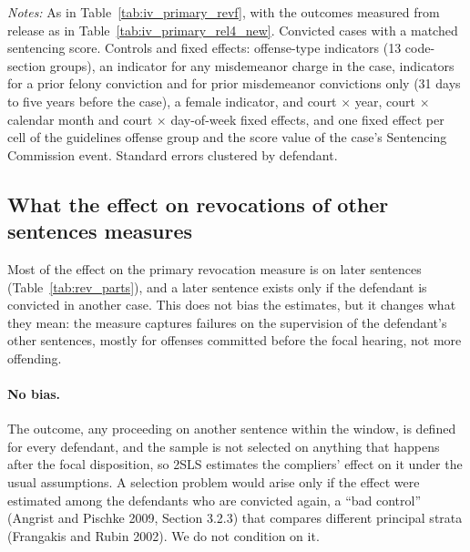 \documentclass[11pt]{article}
\newcommand{\tabnote}[1]{\par\vspace{0.6ex}\begin{minipage}{\linewidth}\linespread{1}\footnotesize\textit{Notes:} #1\end{minipage}}
\newcommand{\controlsnote}{offense-type indicators (13 code-section groups), an indicator for any misdemeanor charge in the case, indicators for a prior felony conviction and for prior misdemeanor convictions only (31 days to five years before the case), a female indicator, and court $\times$ year, court $\times$ calendar month and court $\times$ day-of-week fixed effects}
\newcommand{\specnoteprim}{Convicted cases with a matched sentencing score. Controls and fixed effects: \controlsnote, and one fixed effect per cell of the guidelines offense group and the score value of the case's Sentencing Commission event. Standard errors clustered by defendant.}
\begin{document}
\begin{table}[H]
\centering
\caption{2SLS from release, time served at most four years: revocations of the focal sentences}\label{tab:iv_primary_rel4_revf}
{\small\linespread{1}\selectfont\renewcommand{\arraystretch}{0.9}}
\tabnote{As in Table~\ref{tab:iv_primary_revf}, with the outcomes measured from release as in Table~\ref{tab:iv_primary_rel4_new}. \specnoteprim}
\end{table}

\subsection{What the effect on revocations of other sentences measures}\label{sec:revother_meaning}

Most of the effect on the primary revocation measure is on later sentences (Table~\ref{tab:rev_parts}), and a later sentence exists only if the defendant is convicted in another case. This does not bias the estimates, but it changes what they mean: the measure captures failures on the supervision of the defendant's other sentences, mostly for offenses committed before the focal hearing, not more offending.

\paragraph{No bias.} The outcome, any proceeding on another sentence within the window, is defined for every defendant, and the sample is not selected on anything that happens after the focal disposition, so 2SLS estimates the compliers' effect on it under the usual assumptions. A selection problem would arise only if the effect were estimated among the defendants who are convicted again, a ``bad control'' (Angrist and Pischke 2009, Section 3.2.3) that compares different principal strata (Frangakis and Rubin 2002). We do not condition on it.
\end{document}
